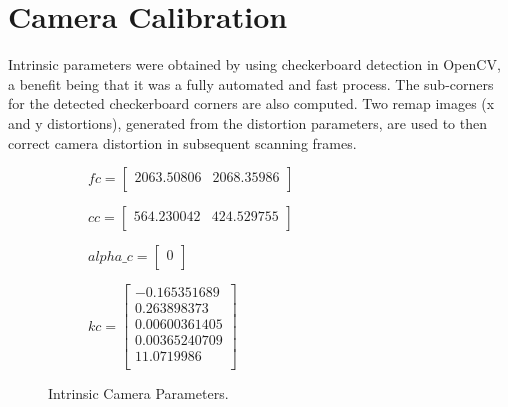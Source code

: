 \documentclass[10pt]{article}
\begin{document}
\section{Camera Calibration}
Intrinsic parameters were obtained by using checkerboard detection in OpenCV, a benefit being that it was a fully automated and fast process. The sub-corners for the detected checkerboard corners are also computed. Two remap images (x and y distortions), generated from the distortion parameters, are used to then correct camera distortion in subsequent scanning frames.
\begin{figure}[h!]
  \centering
\begin{subfigure}[b]{\linewidth}
\centering
$fc = \begin{bmatrix}
   2063.50806 & 2068.35986\\[0.3em]
 \end{bmatrix}
 $
 \end{subfigure}
 \begin{subfigure}[b]{\linewidth}
 \centering
$cc = \begin{bmatrix}
   564.230042 & 424.529755 \\[0.3em]
 \end{bmatrix}
 $
 \end{subfigure}
  \begin{subfigure}[b]{\linewidth}
 \centering
$alpha\_c = \begin{bmatrix}
   0 \\[0.3em]
 \end{bmatrix}
 $
 \end{subfigure}
  \begin{subfigure}[b]{\linewidth}
 \centering
$kc = \begin{bmatrix}
   -0.165351689 \\[0.3em]
   0.263898373 \\[0.3em]
   0.00600361405 \\[0.3em]
   0.00365240709 \\[0.3em]
   11.0719986 \\[0.3em]
 \end{bmatrix}
 $
 \end{subfigure}
      \caption{Intrinsic Camera Parameters.}\label{}
\end{figure}
\end{document}
